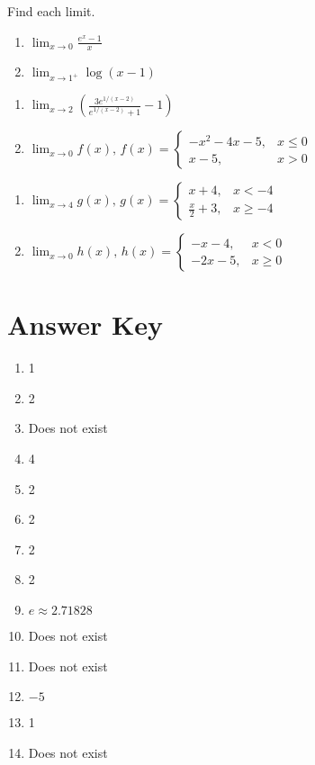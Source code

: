 Find each limit.
\begin{multicols}{2}
\begin{enumerate}	\setcounter{enumi}{\value{Review}}
	\item $\displaystyle \lim_{x \to 0} \frac{e^x - 1}{x}$
	\item $\displaystyle \lim_{x \to 1^+} \log(x-1)$
\end{enumerate}	\setcounter{Review}{\value{enumi}}
\end{multicols}
\smallskip
\begin{multicols}{2}
\begin{enumerate}	\setcounter{enumi}{\value{Review}}
	\item $\displaystyle \lim_{x \to 2} \left(\frac{3e^{1/(x-2)}}{e^{1/(x-2)}+1}-1\right)$
	\item $\displaystyle \lim_{x \to 0} f(x), \, f(x) =  \begin{cases} -x^2-4x-5, & x \leq 0 \\ x-5, & x > 0 \end{cases}$
\end{enumerate}	\setcounter{Review}{\value{enumi}}
\end{multicols}
\smallskip 
\begin{multicols}{2}
\begin{enumerate}	\setcounter{enumi}{\value{Review}}
	\item $\displaystyle \lim_{x \to 4} g(x), \, g(x) = \begin{cases} x+4, & x < -4 \\ \frac{x}{2}+3, & x \geq -4 \end{cases}$
	\item $\displaystyle \lim_{x \to 0} h(x), \, h(x) = \begin{cases} -x-4, & x< 0 \\ -2x-5, & x \geq 0 \end{cases}$
\end{enumerate}
\end{multicols}

\newpage

\section{Answer Key}

\begin{enumerate}
	\item 1
    \item 2 
    \item Does not exist
    \item 4
    \item 2
    \item 2
    \item 2
    \item 2
    \item $e \approx 2.71828$
    \item Does not exist
    \item Does not exist
    \item $-5$
    \item 1
    \item Does not exist
\end{enumerate}